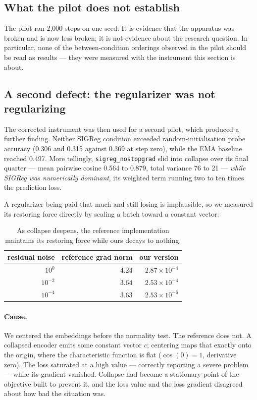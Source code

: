 \subsection{What the pilot does not establish}

\interp{} The pilot ran 2{,}000 steps on one seed. It is evidence that the apparatus was
broken and is now less broken; it is not evidence about the research question. In
particular, none of the between-condition orderings observed in the pilot should be read
as results --- they were measured with the instrument this section is about.

\subsection{A second defect: the regularizer was not regularizing}

The corrected instrument was then used for a second pilot, which produced a further
finding. Neither SIGReg condition exceeded random-initialisation probe accuracy (0.306 and
0.315 against 0.369 at step zero), while the EMA baseline reached 0.497. More tellingly,
\texttt{sigreg\_nostopgrad} slid into collapse over its final quarter --- mean pairwise
cosine 0.564 to 0.879, total variance 76 to 21 --- \emph{while SIGReg was numerically
dominant}, its weighted term running two to ten times the prediction loss.

A regularizer being paid that much and still losing is implausible, so we measured its
restoring force directly by scaling a batch toward a constant vector:

\begin{table}[h]
\centering
\small
\begin{tabular}{r r r}
\toprule
\textbf{residual noise} & \textbf{reference grad norm} & \textbf{our version} \\
\midrule
$10^{0}$  & 4.24 & $2.87\times10^{-4}$ \\
$10^{-2}$ & 3.64 & $2.53\times10^{-4}$ \\
$10^{-4}$ & 3.63 & $2.53\times10^{-6}$ \\
\bottomrule
\end{tabular}
\caption{\ours{} As collapse deepens, the reference implementation maintains its restoring
force while ours decays to nothing.}
\end{table}

\paragraph{Cause.} We centered the embeddings before the normality test. The reference does
not. A collapsed encoder emits some constant vector $c$; centering maps that exactly onto
the origin, where the characteristic function is flat ($\cos(0)=1$, derivative zero). The
loss saturated at a high value --- correctly reporting a severe problem --- while its
gradient vanished. Collapse had become a stationary point of the objective built to prevent
it, and the loss value and the loss gradient disagreed about how bad the situation was.

